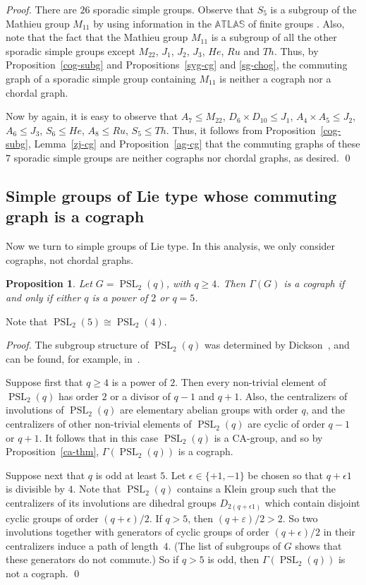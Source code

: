\documentclass{elsarticle}
\newtheorem{prop}[theorem]{Proposition}
\newcommand{\PSL}{\mathop{\mathrm{PSL}}\nolimits}
\begin{document}
\begin{proof}
There are $26$ sporadic simple groups.
Observe that $S_5$ is a subgroup of the Mathieu group $M_{11}$ by
using information in the $\mathbb{ATLAS}$ of finite groups \cite{CC85}.
Also, note that the fact that the Mathieu group $M_{11}$ is a subgroup of all the other sporadic simple groups except $M_{22}$, $J_1$, $J_2$, $J_3$, $He$, $Ru$ and $Th$.
Thus, by Proposition~\ref{cog-subg} and
Propositions~\ref{syg-cg} and \ref{sg-chog}, the commuting graph of a sporadic simple group containing $M_{11}$ is neither a cograph nor a chordal graph.

Now by \cite{CC85} again, it is easy to observe that
$A_7\le M_{22}$, $D_6\times D_{10}\le J_1$, $A_4\times A_{5}\le J_2$, $A_6\le J_3$, $S_6\le He$, $A_8\le Ru$, $S_5\le Th$.
Thus, it follows from Proposition~\ref{cog-subg}, Lemma~\ref{zj-cg} and Proposition~\ref{ag-cg} that
the commuting graphs of these $7$ sporadic simple groups are neither cographs nor chordal graphs, as desired. \qed
\end{proof}


\subsection{Simple groups of Lie type whose commuting graph is a cograph}

Now we turn to simple groups of Lie type. In this analysis, we only consider
cographs, not chordal graphs.

\begin{prop}
Let $G=\PSL_2(q)$, with $q\ge4$. Then $\Gamma(G)$ is a cograph if and only if
either $q$ is a power of $2$ or $q=5$.
\end{prop}

Note that $\PSL_2(5)\cong\PSL_2(4)$.

\begin{proof}
The subgroup structure of $\PSL_2(q)$ was determined by Dickson~\cite{Dickson},
and can be found, for example, in~\cite{BHRD}.

Suppose first that $q\ge 4$ is a power of $2$.
Then every non-trivial element of $\PSL_2(q)$ has order $2$ or a divisor of $q-1$ and $q+1$. Also,
the centralizers of involutions of $\PSL_2(q)$ are elementary abelian groups with order $q$, and the centralizers of other non-trivial elements of $\PSL_2(q)$ are cyclic of order $q-1$ or $q+1$. It follows that in this case $\PSL_2(q)$ is a CA-group, and so by Proposition~\ref{ca-thm}, $\Gamma(\PSL_2(q))$ is a cograph.

Suppose next that $q$ is odd at least $5$. Let $\epsilon\in\{+1,-1\}$ be chosen so that $q+\epsilon1$ is divisible by $4$.
Note that $\PSL_2(q)$ contains a Klein group such that
the centralizers of its involutions are dihedral groups $D_{2(q+\epsilon1)}$ which contain disjoint cyclic groups of order $(q+\epsilon)/2$.
If $q>5$, then $(q+\varepsilon)/2>2$. So two involutions together with generators of cyclic groups of order $(q+\epsilon)/2$ in their centralizers induce a path of length~$4$. (The list of subgroups of $G$ shows that these generators do not commute.) So if $q>5$ is odd, then $\Gamma(\PSL_2(q))$ is not a cograph. \qed
\end{proof}
\end{document}

